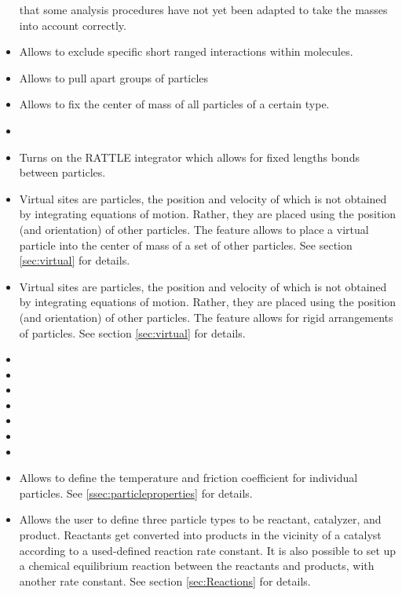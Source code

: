 \begin{itemize}
  that some analysis procedures have not yet been adapted to take the
  masses into account correctly.
\item {} Allows to exclude specific short ranged
  interactions within molecules.
\item {} Allows to pull apart groups of particles
\item {} Allows to fix the center of mass of all particles of a certain type.
\item {} 
\item {} Turns on the RATTLE integrator which
  allows for fixed lengths bonds between particles. 
\item {} Virtual sites are particles,
  the position and velocity of which is not obtained by integrating
  equations of motion. Rather, they are placed using the position (and
  orientation) of other particles. The feature 
  allows to place a virtual particle into the center of mass of a set
  of other particles. See section \ref{sec:virtual} for details.
\item {} Virtual sites are
  particles, the position and velocity of which is not obtained by
  integrating equations of motion. Rather, they are placed using the
  position (and orientation) of other particles. The feature
   allows for rigid arrangements of
  particles. See section \ref{sec:virtual} for details.
\item {}
\item {}
\item {}
\item {}
\item {}
\item {}
\item {}
\item {} Allows to define the temperature and
  friction coefficient for individual particles. See 
  \ref{ssec:particleproperties} for details.
\item {} Allows the user to define three particle types to be
  reactant, catalyzer, and product. Reactants get converted into products in the vicinity of a catalyst according to a used-defined reaction rate constant. It is also possible to set up a chemical equilibrium reaction between the reactants and products, with another rate constant. See section \ref{sec:Reactions} for details.

\end{itemize}
